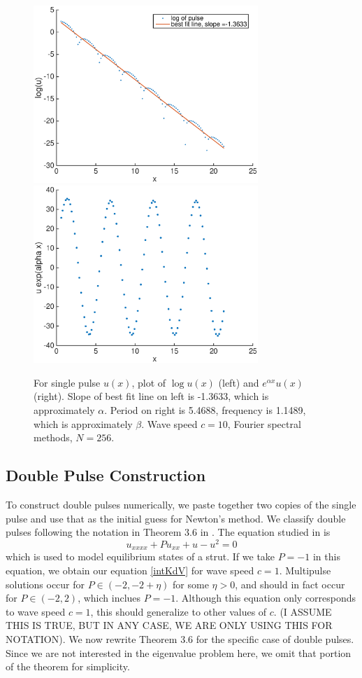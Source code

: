 \documentclass[12pt]{article}
\begin{document}
\begin{figure}[H]
	\includegraphics[width=8.5cm]{decaysinglepulse.eps}
	\includegraphics[width=8.5cm]{oscsinglepulse.eps}
	\caption{For single pulse $u(x)$, plot of $\log u(x)$ (left) and $e^{\alpha x} u(x)$ (right). Slope of best fit line on left is -1.3633, which is approximately $\alpha$. Period on right is 5.4688, frequency is 1.1489, which is approximately $\beta$. Wave speed $c = 10$, Fourier spectral methods, $N = 256$.}
\end{figure}

\subsection{Double Pulse Construction}

To construct double pulses numerically, we paste together two copies of the single pulse and use that as the initial guess for Newton's method. We classify double pulses following the notation in Theorem 3.6 in \cite{Sandstede1997}. The equation studied in \cite{Sandstede1997} is
\begin{equation}\label{strut}
u_{xxxx} + Pu_{xx} + u - u^2 = 0
\end{equation}
which is used to model equilibrium states of a strut. If we take $P = -1$ in this equation, we obtain our equation \eqref{intKdV} for wave speed $c = 1$. Multipulse solutions occur for $P \in (-2, -2 + \eta)$ for some $\eta > 0$, and should in fact occur for $P \in (-2, 2)$, which inclues $P = -1$. Although this equation only corresponds to wave speed $c = 1$, this should generalize to other values of $c$. (I ASSUME THIS IS TRUE, BUT IN ANY CASE, WE ARE ONLY USING THIS FOR NOTATION). We now rewrite Theorem 3.6 for the specific case of double pulses. Since we are not interested in the eigenvalue problem here, we omit that portion of the theorem for simplicity.
\end{document}
